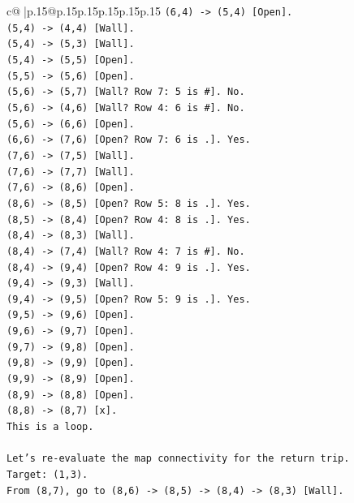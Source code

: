 \documentclass{article}
\begin{document}
{\begin{supertabular}{c@{$\;$}|p{.15\linewidth}@{}p{.15\linewidth}p{.15\linewidth}p{.15\linewidth}p{.15\linewidth}p{.15\linewidth}}
{{{\texttt{(6,4) {-}> (5,4) {[}Open{]}.} \\
\texttt{(5,4) {-}> (4,4) {[}Wall{]}.} \\
\texttt{(5,4) {-}> (5,3) {[}Wall{]}.} \\
\texttt{(5,4) {-}> (5,5) {[}Open{]}.} \\
\texttt{(5,5) {-}> (5,6) {[}Open{]}.} \\
\texttt{(5,6) {-}> (5,7) {[}Wall? Row 7: 5 is \#{]}. No.} \\
\texttt{(5,6) {-}> (4,6) {[}Wall? Row 4: 6 is \#{]}. No.} \\
\texttt{(5,6) {-}> (6,6) {[}Open{]}.} \\
\texttt{(6,6) {-}> (7,6) {[}Open? Row 7: 6 is .{]}. Yes.} \\
\texttt{(7,6) {-}> (7,5) {[}Wall{]}.} \\
\texttt{(7,6) {-}> (7,7) {[}Wall{]}.} \\
\texttt{(7,6) {-}> (8,6) {[}Open{]}.} \\
\texttt{(8,6) {-}> (8,5) {[}Open? Row 5: 8 is .{]}. Yes.} \\
\texttt{(8,5) {-}> (8,4) {[}Open? Row 4: 8 is .{]}. Yes.} \\
\texttt{(8,4) {-}> (8,3) {[}Wall{]}.} \\
\texttt{(8,4) {-}> (7,4) {[}Wall? Row 4: 7 is \#{]}. No.} \\
\texttt{(8,4) {-}> (9,4) {[}Open? Row 4: 9 is .{]}. Yes.} \\
\texttt{(9,4) {-}> (9,3) {[}Wall{]}.} \\
\texttt{(9,4) {-}> (9,5) {[}Open? Row 5: 9 is .{]}. Yes.} \\
\texttt{(9,5) {-}> (9,6) {[}Open{]}.} \\
\texttt{(9,6) {-}> (9,7) {[}Open{]}.} \\
\texttt{(9,7) {-}> (9,8) {[}Open{]}.} \\
\texttt{(9,8) {-}> (9,9) {[}Open{]}.} \\
\texttt{(9,9) {-}> (8,9) {[}Open{]}.} \\
\texttt{(8,9) {-}> (8,8) {[}Open{]}.} \\
\texttt{(8,8) {-}> (8,7) {[}x{]}.} \\
\texttt{This is a loop.} \\
\\ 
\texttt{Let's re{-}evaluate the map connectivity for the return trip.} \\
\texttt{Target: (1,3).} \\
\texttt{From (8,7), go to (8,6) {-}> (8,5) {-}> (8,4) {-}> (8,3) {[}Wall{]}.} \\
}}}
\end{supertabular}}
\end{document}
